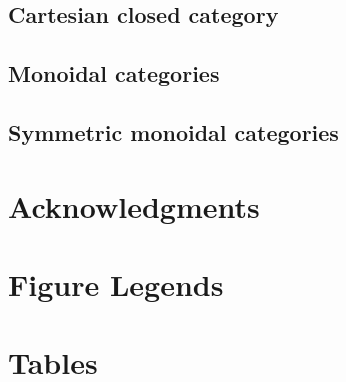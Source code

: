 \subsection*{Cartesian closed category}

%
\subsection*{Monoidal categories}

%
\subsection*{Symmetric monoidal categories}



\section*{Acknowledgments}





\section*{Figure Legends}

\section*{Tables}



